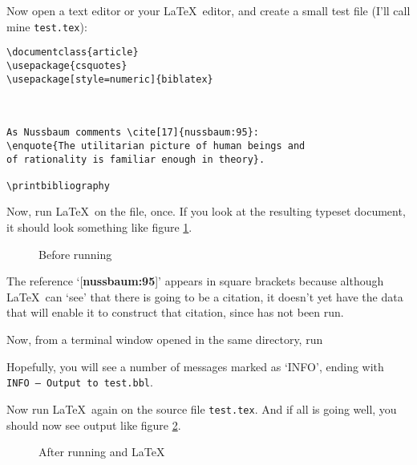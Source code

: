 Now open a text editor or your \LaTeX\ editor, and create a small test
file (I'll call mine \texttt{test.tex}):

\begin{verbatim}
\documentclass{article}
\usepackage{csquotes}
\usepackage[style=numeric]{biblatex}



As Nussbaum comments \cite[17]{nussbaum:95}: 
\enquote{The utilitarian picture of human beings and 
of rationality is familiar enough in theory}.

\printbibliography

\end{verbatim}

Now, run \LaTeX\ on the file, once. If you look at the resulting
typeset document, it should look something like figure
\ref{nussbaum1}.

\begin{figure}
\caption{Before running }\label{nussbaum1}
\end{figure}

The reference `[\textbf{nussbaum:95}]' appears in square brackets
because although \LaTeX\ can `see' that there is going to be a
citation, it doesn't yet have the data that will enable it to
construct that citation, since  has not been run.

Now, from a terminal window opened in the same directory, run

Hopefully, you will see a number of messages marked as `INFO', ending
with \texttt{INFO -- Output to test.bbl}.

Now run \LaTeX\ again on the source file \verb|test.tex|. And if all
is going well, you should now see output like figure \ref{nussbaum2}.

\begin{figure}
\caption{After running  and \LaTeX}\label{nussbaum2}
\end{figure}

